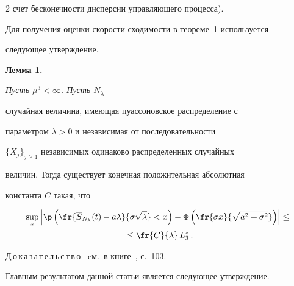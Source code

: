 \begin{multicols}{2}
счет бесконечности дисперсии управляющего процесса).





Для получения оценки скорости сходимости в теореме~1 используется


следующее утверждение.





\smallskip





\noindent


\textbf{Лемма 1.} {\it Пусть $\mu^3 < \infty$. Пусть $N_\lambda$~---


случайная величина, имеющая пуассоновское распределение с


параметром $\lambda>0$ и независимая от по\-сле\-до\-ва\-тель\-ности


$\{X_j\}_{j\geq 1}$ независимых одинаково распределенных случайных


величин. Тогда существует конечная положительная абсолютная


константа $C$ такая, что}


\begin{multline*}


\sup_x \left|\p\left(\fr{\overline{S}_{N_\lambda}(t) -a\lambda}{{\sigma\sqrt{\lambda}}} < x\right)


- \Phi\left(\fr{\sigma x }{{\sqrt{a^2 + \sigma^2}}}\right) \right|


\leq{}\\


{}\leq  \fr{C}{{\lambda}}\,L_3^*\,.


\end{multline*}





\smallskip





Д\,о\,к\,а\,з\,а\,т\,е\,л\,ь\,с\,т\,в\,о \ cм.\ в книге~\cite{1a}, с.~103.





\smallskip





Главным результатом данной статьи является следующее утверждение.





\smallskip






\end{multicols}
